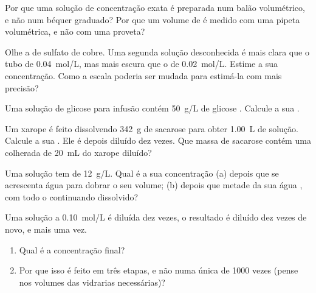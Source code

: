 \begin{exercise}[$\star\star$]\label{exo:g10:concentration-and-dilution:7}
Por que uma solução de concentração exata é preparada num balão
volumétrico, e não num béquer graduado? Por que um volume de
 é medido com uma pipeta volumétrica, e não com uma
proveta?
\end{exercise}

\begin{exercise}[$\star\star$]\label{exo:g10:concentration-and-dilution:8}
Olhe a  de sulfato de cobre. Uma segunda solução
desconhecida é mais clara que o tubo de \qty{0.04}{mol/L}, mas mais
escura que o de \qty{0.02}{mol/L}. Estime a sua concentração. Como a
escala poderia ser mudada para estimá-la com mais precisão?
\end{exercise}

\begin{exercise}[$\star\star$]\label{exo:g10:concentration-and-dilution:9}
Uma solução de glicose para infusão contém \qty{50}{g/L} de glicose
. Calcule a sua .
\end{exercise}

\begin{exercise}[$\star\star$]\label{exo:g10:concentration-and-dilution:10}
Um xarope é feito dissolvendo \qty{342}{g} de sacarose 
para obter \qty{1.00}{L} de solução. Calcule a sua .
Ele é depois diluído dez vezes. Que massa de sacarose contém uma
colherada de \qty{20}{mL} do xarope diluído?
\end{exercise}

\begin{exercise}[$\star\star$]\label{exo:g10:concentration-and-dilution:11}
Uma solução tem  de \qty{12}{g/L}. Qual é a sua
concentração (a) depois que se acrescenta água para dobrar o seu volume;
(b) depois que metade da sua água , com todo o 
continuando dissolvido?
\end{exercise}

\begin{exercise}[$\star\star\star$]\label{exo:g10:concentration-and-dilution:12}
Uma solução a \qty{0.10}{mol/L} é diluída dez vezes, o resultado é
diluído dez vezes de novo, e mais uma vez.
\begin{enumerate}
  \item Qual é a concentração final?
  \item Por que isso é feito em três etapas, e não numa única 
        de 1000 vezes (pense nos volumes das vidrarias necessárias)?
\end{enumerate}
\end{exercise}

